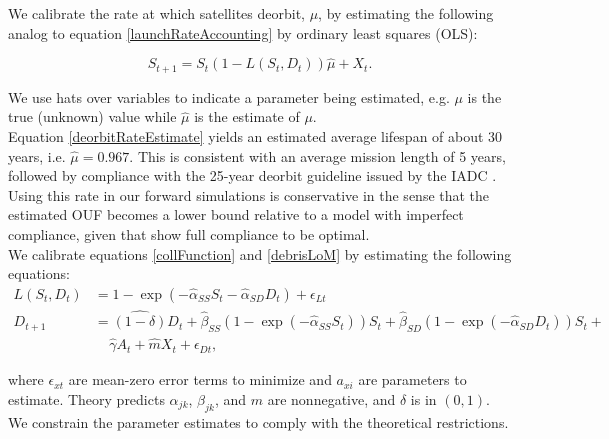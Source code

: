 \documentclass[9pt,twoside,lineno]{pnas-new}
\begin{document}
We calibrate the rate at which satellites deorbit, $\mu$, by estimating the following analog to equation \ref{launchRateAccounting} by ordinary least squares (OLS):

\begin{equation}
\label{deorbitRateEstimate}
S_{t+1} = S_t(1-L(S_t,D_t))\hat{\mu} + X_t.
\end{equation}

We use hats over variables to indicate a parameter being estimated, e.g. $\mu$ is the true (unknown) value while $\hat{\mu}$ is the estimate of $\mu$. \\

Equation \ref{deorbitRateEstimate} yields an estimated average lifespan of about 30 years, i.e. $\hat{\mu} = 0.967$. This is consistent with an average mission length of 5 years, followed by compliance with the 25-year deorbit guideline issued by the IADC \citep{IADCdmg}. 
Using this rate in our forward simulations is conservative in the sense that the estimated OUF becomes a lower bound relative to a model with imperfect compliance, given that \citet{bradleywein2009} show full compliance to be optimal. \\

We calibrate equations \ref{collFunction} and \ref{debrisLoM} by estimating the following equations:
\begin{align}
\label{riskEstimation}
L(S_t,D_t) &= 1 - \exp(-\hat{\alpha}_{SS} S_t-\hat{\alpha}_{SD} D_t) + \epsilon_{L t}  \\
\label{debLoMEstimation}
D_{t+1} &= \hat{(1-\delta)} D_t + \hat{\beta}_{SS} (1-\exp(-\hat{\alpha}_{SS}S_t))S_t + \hat{\beta}_{SD} (1-\exp(-\hat{\alpha}_{SD}D_t))S_t + \\
&~~~~~  \hat{\gamma} A_t + \hat{m} X_t + \epsilon_{D t},
\end{align}

where $\epsilon_{xt}$ are mean-zero error terms to minimize and $a_{xi}$ are parameters to estimate. Theory predicts $\alpha_{jk}$, $\beta_{jk}$, and $m$ are nonnegative, and $\delta$ is in $(0,1)$. We constrain the parameter estimates to comply with the theoretical restrictions.\\
\end{document}

